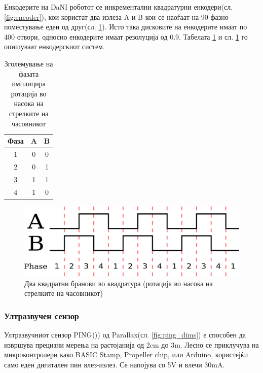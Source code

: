 \documentclass[11pt]{article}
\begin{document}
		  Енкодерите на DaNI роботот се инкрементални квадратурни енкодери(сл. \ref{fig:encoder}), кои користат два излеза A и B кои се наоѓаат на 90 \degree фазно поместување еден од друг(сл. \ref{fig:encoder_quadrature}). Исто така дисковите на енкодерите имаат по 400 отвори, односно енкодерите имаат резолуција од 0.9\degree. Табелата \ref{tab:fazno} и сл. \ref{fig:encoder_quadrature} го опишуваат енкодерскиот систем.

		  \begin{table}[h]
        \caption{Зголемување на фазата имплицира ротација во насока на стрелките на часовникот}
        \label{tab:fazno}
        \begin{center}
          \begin{tabular}{||c|c|c||}
            \hline
            Фаза & A & B \\
            \hline \hline
            1 & 0 & 0 \\
            \hline
					  2 & 0 & 1 \\
            \hline
            3 & 1 & 1 \\
            \hline
            4 & 1 & 0 \\
            \hline
            \end{tabular}
          \end{center}
        \end{table}

      \begin{figure}[H]
        \includegraphics[width=0.5\linewidth]{./images/encoder_quadrature.png}
        \centering
        \caption{Два квадратни бранови во квадратура (ротација во насока на стрелките на часовникот)}
        \label{fig:encoder_quadrature}
        \end{figure}


    \subsubsection{Ултразвучен сензор}
      Ултразвучниот сензор PING))) од Parallax(сл. \ref{fig:ping_dims}) е способен да извршува прецизни мерења на растојанија од 2cm до 3m. Лесно се приклучува на микроконтролери како BASIC Stamp, Propeller chip, или Arduino, користејќи само еден дигитален пин влез-излез. Се напојува со 5V и влечи 30mA.
\end{document}
